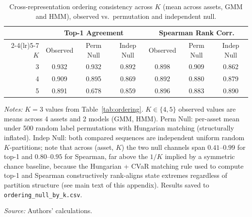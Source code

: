 \documentclass[preprint,12pt,authoryear]{elsarticle}
\begin{document}
\begin{table}[!htbp]
\centering
\small
\setlength{\tabcolsep}{5pt}
\caption{Cross-representation ordering consistency across $K$ (mean across assets, GMM and HMM), observed vs.\ permutation and independent null.}
\label{tab:ordering_extended}
\begin{tabular}{rcccccc}
\toprule
 & \multicolumn{3}{c}{Top-1 Agreement} & \multicolumn{3}{c}{Spearman Rank Corr.} \\
\cmidrule(lr){2-4}\cmidrule(lr){5-7}
$K$ & Observed & Perm Null & Indep Null & Observed & Perm Null & Indep Null \\
\midrule
3 & 0.932 & 0.932 & 0.892 & 0.898 & 0.909 & 0.862 \\
4 & 0.909 & 0.895 & 0.869 & 0.892 & 0.880 & 0.879 \\
5 & 0.891 & 0.678 & 0.859 & 0.896 & 0.883 & 0.890 \\
\bottomrule
\end{tabular}
\par\medskip
\begin{minipage}{\linewidth}
\footnotesize
\textit{Notes:} $K=3$ values from Table~\ref{tab:ordering}.  $K\in\{4,5\}$ observed values are means across 4 assets and 2 models (GMM, HMM).  Perm Null: per-asset mean under 500 random label permutations with Hungarian matching (structurally inflated).  Indep Null: both compared sequences are independent uniform random $K$-partitions; note that across (asset, $K$) the two null channels span $0.41$--$0.99$ for top-1 and $0.80$--$0.95$ for Spearman, far above the $1/K$ implied by a symmetric chance baseline, because the Hungarian + CVaR matching rule used to compute top-1 and Spearman constructively rank-aligns state extremes regardless of partition structure (see main text of this appendix).  Results saved to \texttt{ordering\_null\_by\_k.csv}.

\textit{Source:} Authors' calculations.
\end{minipage}
\end{table}
\end{document}
